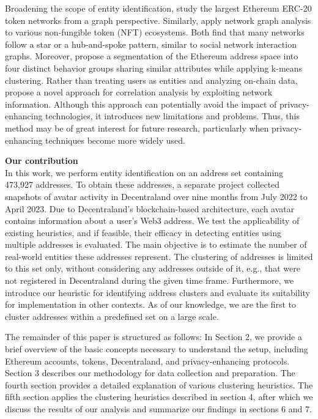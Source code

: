 \documentclass[12pt,a4paper,titlepage,oneside,english]{article}
\begin{document}
Broadening the scope of entity identification, \cite{victorlüders2019} study the largest Ethereum ERC-20 token networks from a graph perspective. Similarly, \cite{casalebrunet2021} apply network graph analysis to various non-fungible token (NFT) ecosystems. Both find that many networks follow a star or a hub-and-spoke pattern, similar to social network interaction graphs. Moreover, \cite{Payette2017} propose a segmentation of the Ethereum address space into four distinct behavior groups sharing similar attributes while applying k-means clustering. \newline
Rather than treating users as entities and analyzing on-chain data, \cite{yu2023} propose a novel approach for correlation analysis by exploiting network information. Although this approach can potentially avoid the impact of privacy-enhancing technologies, it introduces new limitations and problems. Thus, this method may be of great interest for future research, particularly when privacy-enhancing techniques become more widely used.

\textbf{Our contribution}\\
In this work, we perform entity identification on an address set containing 473,927 addresses. To obtain these addresses, a separate project collected snapshots of avatar activity in Decentraland over nine months from July 2022 to April 2023. Due to Decentraland's blockchain-based architecture, each avatar contains information about a user's Web3 address. \newline
We test the applicability of existing heuristics, and if feasible, their efficacy in detecting entities using multiple addresses is evaluated.
The main objective is to estimate the number of real-world entities these addresses represent. The clustering of addresses is limited to this set only, without considering any addresses outside of it, e.g., that were not registered in Decentraland during the given time frame. Furthermore, we introduce our heuristic for identifying address clusters and evaluate its suitability for implementation in other contexts. As of our knowledge, we are the first to cluster addresses within a predefined set on a large scale.

The remainder of this paper is structured as follows: In Section 2, we provide a brief overview of the basic concepts necessary to understand the setup, including Ethereum accounts, tokens, Decentraland, and privacy-enhancing protocols. Section 3 describes our methodology for data collection and preparation. The fourth section provides a detailed explanation of various clustering heuristics. The fifth section applies the clustering heuristics described in section 4, after which we discuss the results of our analysis and summarize our findings in sections 6 and 7.
\end{document}

